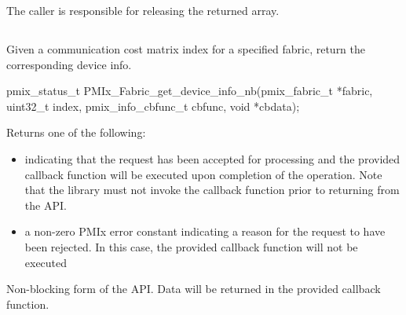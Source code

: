 The caller is responsible for releasing the returned array.


\subsection{}

\summary

Given a communication cost matrix index for a specified fabric, return the corresponding device info.

\format

\cspecificstart
\begin{codepar}
pmix_status_t
PMIx_Fabric_get_device_info_nb(pmix_fabric_t *fabric,
                               uint32_t index,
                               pmix_info_cbfunc_t cbfunc,
                               void *cbdata);
\end{codepar}
\cspecificend

\begin{arglist}
\end{arglist}

Returns one of the following:

\begin{itemize}
\item {} indicating that the request has been accepted for processing and the provided callback function will be executed upon completion of the operation. Note that the library must not invoke the callback function prior to returning from the \ac{API}.
\item a non-zero \ac{PMIx} error constant indicating a reason for the request to have been rejected. In this case, the provided callback function will not be executed
\end{itemize}

\descr

Non-blocking form of the  \ac{API}. Data will be returned in the provided callback function.


